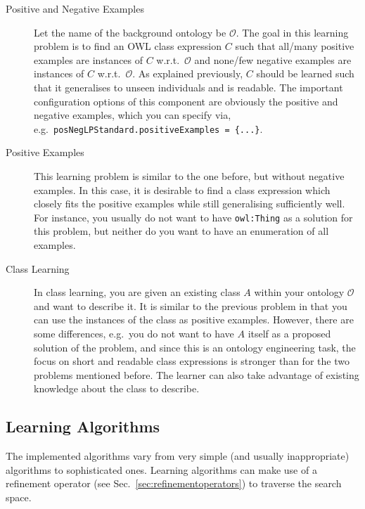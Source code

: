 \documentclass[a4paper,12pt]{scrartcl}
\begin{document}
\begin{description}
 \item[Positive and Negative Examples] Let the name of the background ontology be $\mathcal{O}$. The goal in this learning problem is to find an OWL class expression $C$ such that all/many positive examples are instances of $C$ w.r.t.~$\mathcal{O}$ and none/few negative examples are instances of $C$ w.r.t.~$\mathcal{O}$. As explained previously, $C$ should be learned such that it generalises to unseen individuals and is readable. The important configuration options of this component are obviously the positive and negative examples, which you can specify via, e.g.~\texttt{\small posNegLPStandard.positiveExamples = \{...\}}.
 \item[Positive Examples] This learning problem is similar to the one before, but without negative examples. In this case, it is desirable to find a class expression which closely fits the positive examples while still generalising sufficiently well. For instance, you usually do not want to have \verb|owl:Thing| as a solution for this problem, but neither do you want to have an enumeration of all examples.
 \item[Class Learning] In class learning, you are given an existing class $A$ within your ontology $\mathcal{O}$ and want to describe it. It is similar to the previous problem in that you can use the instances of the class as positive examples. However, there are some differences, e.g.~you do not want to have $A$ itself as a proposed solution of the problem, and since this is an ontology engineering task, the focus on short and readable class expressions is stronger than for the two problems mentioned before. The learner can also take advantage of existing knowledge about the class to describe.
\end{description}

\subsection{Learning Algorithms}

The implemented algorithms vary from very simple (and usually inappropriate) algorithms to sophisticated ones.
Learning algorithms can make use of a refinement operator (see Sec.~\ref{sec:refinementoperators}) to traverse the search space.
\end{document}
